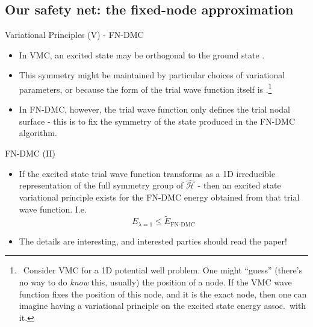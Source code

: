 \documentclass[12pt, pdf, hyperref={draft}, usenames, dvipsnames,
aspectratio=169]{beamer}
\newcommand{\red}[1]{{\bf\color{LancsRed}{#1}}}
\newcommand{\blue}[1]{{\bf\color{NavyBlue}{#1}}}
\newcommand{\green}[1]{{\bf\color{ForestGreen}{#1}}}
\begin{document}
\subsection{Our safety net: the fixed-node approximation}\label{sub:fna}
\begin{frame}{Variational Principles (V) - FN-DMC}

\begin{itemize}

  \item In VMC, an excited state may be orthogonal to the ground state
  \blue{because of symmetry}.

  \item This symmetry might be maintained by particular choices of variational
  parameters, or because the form of the trial wave function itself is \blue{limited
  in form}.\footnote{\ Consider VMC for a 1D potential well problem. One might
  ``guess'' (there's no way to do \textit{know} this, usually) the position of
  a node. If the VMC wave function fixes the position of this node, and it is
  the exact node, then one can imagine having a variational principle on the
  excited state energy assoc.\ with it.}

  \item In FN-DMC, however, the trial wave function only defines the trial
  nodal surface - this is \red{not enough} to fix the symmetry of the state
  produced in the FN-DMC algorithm.


\end{itemize}

\end{frame}

\begin{frame}{FN-DMC (II)}

\begin{itemize}

  \item If the excited state trial wave function transforms as a 1D irreducible
  representation of the full symmetry group of $\mathcal{\hat H}$ - then an
  excited state variational principle exists for the FN-DMC energy obtained
  from that trial wave function. I.e.\
  \begin{equation}
    E_{\lambda=1} \leq \tilde E_{\text{FN-DMC}}
  \end{equation}
  \item The details are interesting, and interested parties should read the
  paper!

\end{itemize}

\end{frame}
\end{document}
